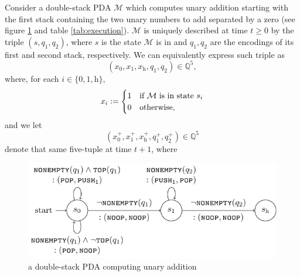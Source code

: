 \documentclass{book}
\newcommand{\defeq}{\vcentcolon=}
\newcommand{\Q}{\mathbb{Q}}
\newcommand{\h}{\mathrm{h}}
\theoremstyle{definition}
\theoremstyle{plain}
\theoremstyle{plain}
\theoremstyle{remark}
\theoremstyle{plain}
\begin{document}
	Consider a double-stack PDA $\mathcal{M}$ which computes unary addition starting with the first stack containing the two unary numbers to add separated by a zero (see figure \ref{fig:PDA} and table \ref{tab:execution}). $\mathcal{M}$ is uniquely described at time $t\geq0$ by the triple $(s,q_1,q_2)$, where $s$ is the state $\mathcal{M}$ is in and $q_1,q_2$ are the encodings of its first and second stack, respectively. We can equivalently express such triple as $$(x_0,x_1,x_\h,q_1,q_2)\in\Q^5,$$ where, for each $i\in\{0,1,\h\}$,
	$$
		x_i\defeq 
			\begin{cases}
				1 & \text{if $\mathcal{M}$ is in state $s_i$} \\
				0 & \text{otherwise,} 
			\end{cases}
	$$
	and we let $$\!\left(x_0^+,x_1^+,x_\h^+,q_1^+,q_2^+\right)\in\Q^5$$ denote that same five-tuple at time $t+1$, where
	\begin{figure}[t]
		\centering
		\includegraphics{PDA.pdf}
		\caption{a double-stack PDA computing unary addition}
		\label{fig:PDA}
	\end{figure}
	
	\begingroup
	\allowdisplaybreaks
\end{document}
